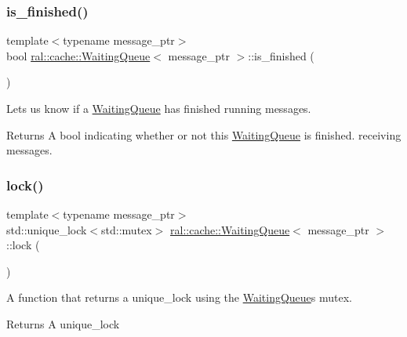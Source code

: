 \subsubsection{\texorpdfstring{is\+\_\+finished()}{is\_finished()}}
{\footnotesize\ttfamily template$<$typename message\+\_\+ptr$>$ \\
bool \hyperlink{classral_1_1cache_1_1WaitingQueue}{ral\+::cache\+::\+Waiting\+Queue}$<$ message\+\_\+ptr $>$\+::is\+\_\+finished (\begin{DoxyParamCaption}{ }\end{DoxyParamCaption})\hspace{0.3cm}{\ttfamily [inline]}}

Lets us know if a \hyperlink{classral_1_1cache_1_1WaitingQueue}{Waiting\+Queue} has finished running messages. \begin{DoxyReturn}{Returns}
A bool indicating whether or not this \hyperlink{classral_1_1cache_1_1WaitingQueue}{Waiting\+Queue} is finished. receiving messages. 
\end{DoxyReturn}
\mbox{\label{classral_1_1cache_1_1WaitingQueue_ad5ef46c8b24d7de3f2a00c4e6f927e0a}} 
\subsubsection{\texorpdfstring{lock()}{lock()}}
{\footnotesize\ttfamily template$<$typename message\+\_\+ptr$>$ \\
std\+::unique\+\_\+lock$<$std\+::mutex$>$ \hyperlink{classral_1_1cache_1_1WaitingQueue}{ral\+::cache\+::\+Waiting\+Queue}$<$ message\+\_\+ptr $>$\+::lock (\begin{DoxyParamCaption}{ }\end{DoxyParamCaption})\hspace{0.3cm}{\ttfamily [inline]}}

A function that returns a unique\+\_\+lock using the \hyperlink{classral_1_1cache_1_1WaitingQueue}{Waiting\+Queue}\textquotesingle{}s mutex. \begin{DoxyReturn}{Returns}
A unique\+\_\+lock 
\end{DoxyReturn}
\mbox{\label{classral_1_1cache_1_1WaitingQueue_a259a82267567c6b5da96bd1bac53f6db}} 
